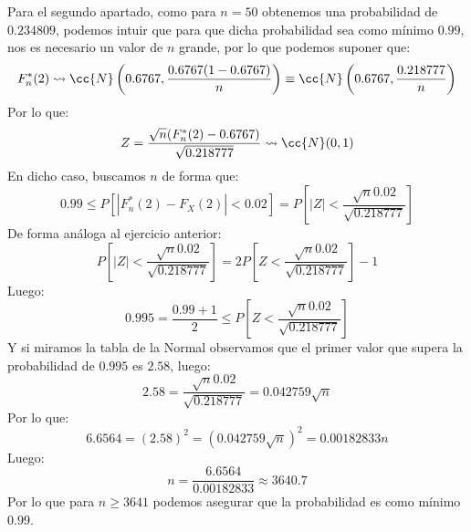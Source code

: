 \begin{ejercicio}
    \noindent
    Para el segundo apartado, como para $n=50$ obtenemos una probabilidad de $0.234809$, podemos intuir que para que dicha probabilidad sea como mínimo $0.99$, nos es necesario un valor de $n$ grande, por lo que podemos suponer que:
    \begin{equation*}
        F_n^\ast(2) \rightsquigarrow \cc{N}\left(0.6767, \dfrac{0.6767(1-0.6767)}{n}\right) \equiv \cc{N}\left(0.6767, \dfrac{0.218777}{n}\right)
    \end{equation*}
    Por lo que:
    \begin{equation*}
        Z = \dfrac{\sqrt{n}(F_n^\ast(2) - 0.6767)}{\sqrt{0.218777}} \rightsquigarrow\cc{N}(0,1)
    \end{equation*}
    En dicho caso, buscamos $n$ de forma que:
    \begin{equation*}
        0.99 \leq P[|F_n^\ast(2) - F_X(2)| < 0.02] = P\left[|Z| < \dfrac{\sqrt{n}0.02}{\sqrt{0.218777}}\right]
    \end{equation*}
    De forma análoga al ejercicio anterior:
    \begin{equation*}
        P\left[|Z| < \dfrac{\sqrt{n}0.02}{\sqrt{0.218777}}\right] = 2P\left[Z < \dfrac{\sqrt{n}0.02}{\sqrt{0.218777}}\right] - 1
    \end{equation*}
    Luego:
    \begin{equation*}
        0.995 = \dfrac{0.99 + 1}{2} \leq P\left[Z < \dfrac{\sqrt{n}0.02}{\sqrt{0.218777}}\right] 
    \end{equation*}
    Y si miramos la tabla de la Normal observamos que el primer valor que supera la probabilidad de $0.995$ es $2.58$, luego:
    \begin{equation*}
        2.58 = \dfrac{\sqrt{n}0.02}{\sqrt{0.218777}} = 0.042759 \sqrt{n}
    \end{equation*}
    Por lo que:
    \begin{equation*}
        6.6564 = {(2.58)}^{2} = {(0.042759 \sqrt{n})}^{2} = 0.00182833 n
    \end{equation*}
    Luego:
    \begin{equation*}
        n = \dfrac{6.6564}{0.00182833} \approx 3640.7
    \end{equation*}
    Por lo que para $n\geq 3641$ podemos asegurar que la probabilidad es como mínimo $0.99$.
\end{ejercicio}

